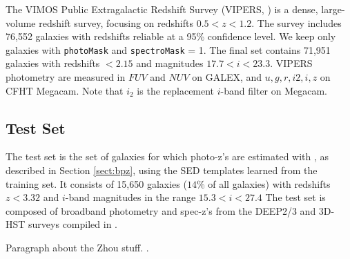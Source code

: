 The VIMOS Public Extragalactic Redshift Survey (VIPERS, \citealt{Scodeggio2018a}) is a dense, large-volume redshift survey, focusing on redshifts $0.5 < z < 1.2$. 
The survey includes 76,552 galaxies with redshifts reliable at a 95\% confidence level.
We keep only galaxies with \texttt{photoMask} and \texttt{spectroMask} = 1.
The final set contains 71,951 galaxies with redshifts $< 2.15$ and magnitudes $17.7 < i < 23.3$. 
VIPERS photometry are measured in $FUV$ and $NUV$ on GALEX, and $u,g,r,i2,i,z$ on CFHT Megacam. 
Note that $i_2$ is the replacement $i$-band filter on Megacam. 

\subsection{Test Set}

The test set is the set of galaxies for which photo-z's are estimated with \bpz, as described in Section \ref{sect:bpz}, using the SED templates learned from the training set. 
It consists of 15,650 galaxies ($14\%$ of all galaxies) with redshifts $z < 3.32$ and $i$-band magnitudes in the range $15.3 < i < 27.4$
The test set is composed of broadband photometry and spec-z's from the DEEP2/3 and 3D-HST surveys compiled in \citet{Zhou2019a}.

Paragraph about the Zhou stuff. \citep{Zhou2019a,Newman2013b,Momcheva2016b}.

